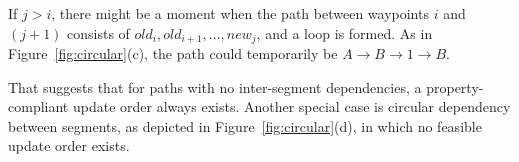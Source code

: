 If $j > i$, there might be a moment when the path between waypoints
$i$ and $(j+1)$ consists of $old_i, old_{i+1}, ..., new_j$, and a loop is formed.
As in Figure~\ref{fig:circular}(c), the path could temporarily be $A \rightarrow B \rightarrow 1 \rightarrow B$.

That suggests that for paths with no inter-segment dependencies, 
a property-compliant update order always exists.
Another special case is circular dependency between segments, as depicted in Figure~\ref{fig:circular}(d), 
in which no feasible update order exists.

